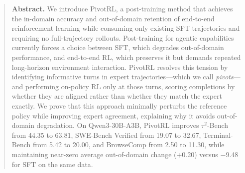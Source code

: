 \begin{abstract}
\large \textbf{Abstract.}
\normalsize
We introduce PivotRL, a post-training method that achieves the in-domain accuracy and out-of-domain retention of end-to-end reinforcement learning while consuming only existing SFT trajectories and requiring no full-trajectory rollouts. Post-training for agentic capabilities currently forces a choice between SFT, which degrades out-of-domain performance, and end-to-end RL, which preserves it but demands repeated long-horizon environment interaction. PivotRL resolves this tension by identifying informative turns in expert trajectories—which we call \emph{pivots}—and performing on-policy RL only at those turns, scoring completions by whether they are aligned rather than whether they match the expert exactly. We prove that this approach minimally perturbs the reference policy while improving expert agreement, explaining why it avoids out-of-domain degradation. On Qwen3-30B-A3B, PivotRL improves $\tau^2$-Bench from 44.35 to 63.81, SWE-Bench Verified from 19.07 to 32.67, Terminal-Bench from 5.42 to 20.00, and BrowseComp from 2.50 to 11.30, while maintaining near-zero average out-of-domain change (+0.20) versus −9.48 for SFT on the same data.
\end{abstract}





